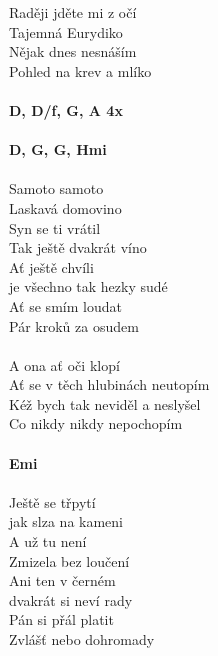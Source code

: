 \begin{multicols}{2}
Raději jděte mi z očí\\
Tajemná Eurydiko\\
Nějak dnes nesnáším\\
Pohled na krev a mlíko\\
\\
\footnotesize\textbf{D, D/f\kr , G, A 4x}\\
\\
\textbf{D, G, G, Hmi}\\
\normalsize
\\
Samoto samoto\\
Laskavá domovino\\
Syn se ti vrátil\\
Tak ještě dvakrát víno\\
Ať ještě chvíli\\
je všechno tak hezky sudé\\
Ať se smím loudat\\
Pár kroků za osudem\\
\\
A ona ať oči klopí\\
Ať se v těch hlubinách neutopím\\
Kéž bych tak neviděl a neslyšel\\
Co nikdy nikdy nepochopím\\
\\
\footnotesize\textbf{Emi}\\
\normalsize
\\
Ještě se třpytí\\
jak slza na kameni\\
A už tu není\\
Zmizela bez loučení\\
Ani ten v černém\\
dvakrát si neví rady\\
Pán si přál platit\\
Zvlášť nebo dohromady\\
\end{multicols}